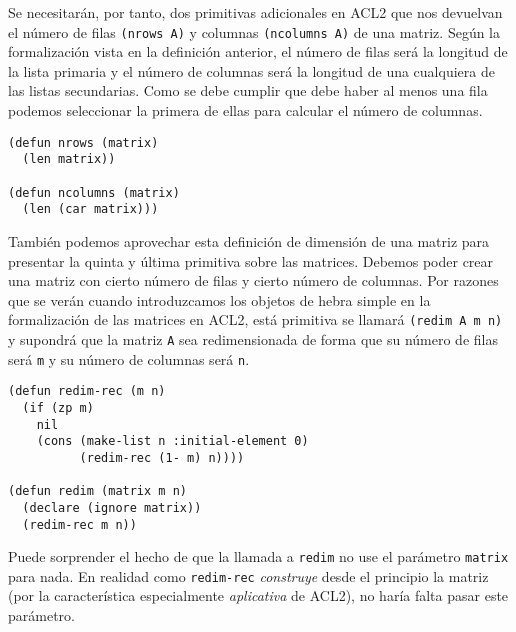 \documentclass[a4paper,10pt]{article}
\begin{document}
\par \vspace{10pt}

Se necesitarán, por tanto, dos primitivas adicionales en ACL2 que nos devuelvan el número de filas \texttt{(nrows A)} y columnas \texttt{(ncolumns A)} de una matriz. Según la formalización vista en la definición anterior, el número de filas será la longitud de la lista primaria y el número de columnas será la longitud de una cualquiera de las listas secundarias. Como se debe cumplir que debe haber al menos una fila podemos seleccionar la primera de ellas para calcular el número de columnas. 

\par \vspace{10pt}

\begin{lstlisting}[language=clips]
(defun nrows (matrix)
  (len matrix))

(defun ncolumns (matrix)
  (len (car matrix)))
\end{lstlisting}
	
\par \vspace{10pt}

También podemos aprovechar esta definición de dimensión de una matriz para presentar la quinta y última primitiva sobre las matrices. Debemos poder crear una matriz con cierto número de filas y cierto número de columnas. Por razones que se verán cuando introduzcamos los objetos de hebra simple en la formalización de las matrices en ACL2, está primitiva se llamará \texttt{(redim A m n)} y supondrá que la matriz \texttt{A} sea redimensionada de forma que su número de filas será \texttt{m} y su número de columnas será \texttt{n}. 

\par \vspace{10pt}

\begin{lstlisting}[language=clips]
(defun redim-rec (m n)
  (if (zp m)
    nil
    (cons (make-list n :initial-element 0) 
          (redim-rec (1- m) n))))

(defun redim (matrix m n)
  (declare (ignore matrix))
  (redim-rec m n))
\end{lstlisting}
	
\par \vspace{10pt}

Puede sorprender el hecho de que la llamada a \texttt{redim} no use el parámetro \texttt{matrix} para nada. En realidad como \texttt{redim-rec} \emph{construye} desde el principio la matriz (por la característica especialmente \emph{aplicativa} de ACL2), no haría falta pasar este parámetro. 
\end{document}

